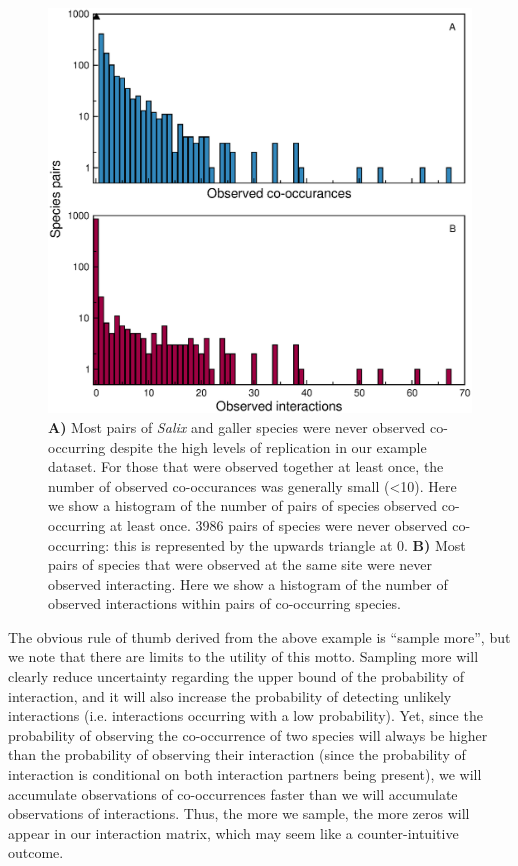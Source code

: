 ﻿\documentclass[12pt]{article}
\begin{document}
  \begin{figure}
    \caption{\textbf{A)} Most pairs of \emph{Salix} and galler species were never observed co-occurring despite the high levels of replication in our example dataset. For those that were observed together at least once, the number of observed co-occurances was generally small (\textless10). Here we show a histogram of the number of pairs of species observed co-occurring at least once. 3986 pairs of species were never observed co-occurring: this is represented by the upwards triangle at 0. \textbf{B)} Most pairs of species that were observed at the same site were never observed interacting. Here we show a histogram of the number of observed interactions within pairs of co-occurring species.}
    \label{histograms}
    \includegraphics*[width=.8\textwidth]{figures/Salix_Galler_histogram.eps}
    \end{figure}


  The obvious rule of thumb derived from the above example is “sample more”, but we note that there are limits to the utility of this motto. Sampling more will clearly reduce uncertainty regarding the upper bound of the probability of interaction, and it will also increase the probability of detecting unlikely interactions (i.e. interactions occurring with a low probability). Yet, since the probability of observing the co-occurrence of two species will always be higher than the probability of observing their interaction (since the probability of interaction is conditional on both interaction partners being present), we will accumulate observations of co-occurrences faster than we will accumulate observations of interactions. Thus, the more we sample, the more zeros will appear in our interaction matrix, which may seem like a counter-intuitive outcome.
\end{document}
